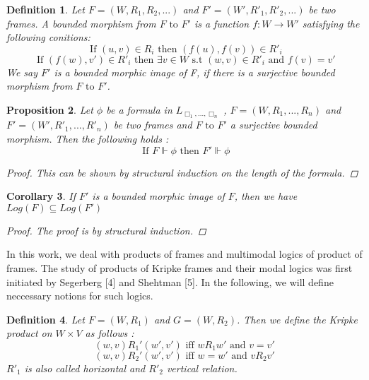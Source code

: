 \documentclass[12pt, a4paper]{scrartcl}
\newtheorem{definition}{Definition}[subsection]
\newtheorem{proposition}[definition]{Proposition}
\newtheorem{corollary}[definition]{Corollary}
\begin{document}
\begin{definition}
    Let $F = (W,R_1, R_2, ...)$ and $F' = (W', R'_1, R'_2, ...)$ be two frames. A bounded morphism from $F \mbox{ to } F'$ is a function
    $f : W \rightarrow W'$ satisfying the following conitions: 
    $$ \mbox{ If } (u,v) \in R_i  \mbox{ then }(f(u), f(v)) \in R'_i $$
    $$ \mbox{ If } (f(w), v') \in R'_i \mbox{ then } \exists v \in W \mbox{ s.t } (w,v) \in R'_i \mbox{ and } f(v) = v'$$
    We say $F'$ is a bounded morphic image of F, if there is a surjective bounded morphism from $F \mbox{ to } F'$.
        
\end{definition}

\begin{proposition}
    Let $\phi$ be a formula in $L_{\Box_1,...,\Box_n}$ , $F = (W, R_1,...,R_n)$ and $F' = (W', R'_1,...,R'_n)$ be two frames and $F \mbox{ to } F'$ a surjective bounded morphism. Then the following holds :
    $$ \mbox{ If }F \Vdash \phi \mbox{ then } F' \Vdash \phi$$
    \begin{proof}
            This can be shown by structural induction on the length of the formula.
    \end{proof}
        
\end{proposition}

\begin{corollary}
    If $F'$ is a bounded morphic image of $F$, then we have $Log(F) \subseteq Log(F')$
    \begin{proof}
        The proof is by structural induction.
        
    \end{proof}
    
\end{corollary}

In this work, we deal with products of frames and multimodal logics of product of frames. The study of products of Kripke frames 
and their modal logics was first initiated by Segerberg [4] and Shehtman [5]. In the following, we will define neccessary notions for such logics.

\begin{definition}
    Let $F = (W, R_1)$ and $G = (W,R_2)$. Then we define the Kripke product on $W \times V$ as follows : 
    $$(w,v)R_1'(w',v') \mbox{ iff } wR_1w' \mbox{ and } v = v'$$
    $$(w,v)R_2  '(w',v') \mbox{ iff } w = w' \mbox{ and } vR_2v'$$
    $R'_1$ is also called horizontal and $R'_2$ vertical relation.
\end{definition}
\end{document}
